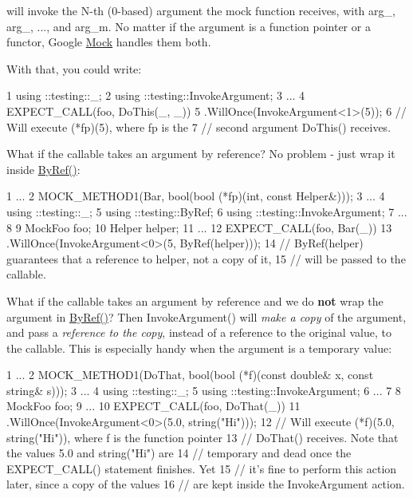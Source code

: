 will invoke the {\ttfamily N}-\/th (0-\/based) argument the mock function receives, with {\ttfamily arg\+\_}, {\ttfamily arg\+\_}, ..., and {\ttfamily arg\+\_\+m}. No matter if the argument is a function pointer or a functor, Google \hyperlink{class_mock}{Mock} handles them both.

With that, you could write\+:


\begin{DoxyCode}
1 using ::testing::\_;
2 using ::testing::InvokeArgument;
3 ...
4   EXPECT\_CALL(foo, DoThis(\_, \_))
5       .WillOnce(InvokeArgument<1>(5));
6   // Will execute (*fp)(5), where fp is the
7   // second argument DoThis() receives.
\end{DoxyCode}


What if the callable takes an argument by reference? No problem -\/ just wrap it inside {\ttfamily \hyperlink{namespacetesting_aaee6d42dcd69de6e7a1459c5c71222c3}{By\+Ref()}}\+:


\begin{DoxyCode}
1 ...
2   MOCK\_METHOD1(Bar, bool(bool (*fp)(int, const Helper&)));
3 ...
4 using ::testing::\_;
5 using ::testing::ByRef;
6 using ::testing::InvokeArgument;
7 ...
8 
9   MockFoo foo;
10   Helper helper;
11   ...
12   EXPECT\_CALL(foo, Bar(\_))
13       .WillOnce(InvokeArgument<0>(5, ByRef(helper)));
14   // ByRef(helper) guarantees that a reference to helper, not a copy of it,
15   // will be passed to the callable.
\end{DoxyCode}


What if the callable takes an argument by reference and we do {\bfseries not} wrap the argument in {\ttfamily \hyperlink{namespacetesting_aaee6d42dcd69de6e7a1459c5c71222c3}{By\+Ref()}}? Then {\ttfamily Invoke\+Argument()} will {\itshape make a copy} of the argument, and pass a {\itshape reference to the copy}, instead of a reference to the original value, to the callable. This is especially handy when the argument is a temporary value\+:


\begin{DoxyCode}
1 ...
2   MOCK\_METHOD1(DoThat, bool(bool (*f)(const double& x, const string& s)));
3 ...
4 using ::testing::\_;
5 using ::testing::InvokeArgument;
6 ...
7 
8   MockFoo foo;
9   ...
10   EXPECT\_CALL(foo, DoThat(\_))
11       .WillOnce(InvokeArgument<0>(5.0, string("Hi")));
12   // Will execute (*f)(5.0, string("Hi")), where f is the function pointer
13   // DoThat() receives.  Note that the values 5.0 and string("Hi") are
14   // temporary and dead once the EXPECT\_CALL() statement finishes.  Yet
15   // it's fine to perform this action later, since a copy of the values
16   // are kept inside the InvokeArgument action.
\end{DoxyCode}


